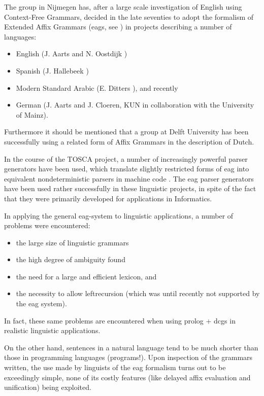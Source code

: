 The group in Nijmegen has, after a large scale investigation of English
using Context-Free Grammars, decided in the late seventies
to adopt the formalism of Extended Affix Grammars
({\sc eag}s, see \cite{l20}) in projects describing a number of languages:
\begin{itemize}
\item English (J. Aarts and N. Oostdijk \cite{l23})
\item Spanish (J. Hallebeek \cite{l26,hallebeek:diss})
\item Modern Standard Arabic (E. Ditters \cite{l25}), and recently
\item German (J. Aarts and J. Cloeren, KUN in collaboration with the
University of Mainz).
\end{itemize}
Furthermore it should be mentioned that a group at Delft University \cite{l29}
has been successfully using a related form of Affix Grammars in the description of Dutch.

In the course of the TOSCA project, a number
of increasingly powerful parser generators have been used,
which translate slightly restricted forms of {\sc eag} into equivalent
nondeterministic parsers in machine code \cite{l20}. The {\sc eag} parser generators
have been used rather successfully in these linguistic projects, in spite of
the fact that they were primarily developed for applications in Informatics.

In applying the general {\sc eag}-system to linguistic applications, a number
of problems were encountered:
\begin{itemize}
\item the large size of linguistic grammars
\item the high degree of ambiguity found
\item the need for a large and efficient lexicon, and
\item the necessity to allow leftrecursion (which was until recently
not supported by the {\sc eag} system).
\end{itemize}
In fact, these same problems are encountered when using
{\sc prolog} + {\sc dcg}s in realistic linguistic applications.

On the other hand, sentences in a natural language tend to be much
shorter than those in programming languages (programs!).
Upon inspection of the grammars written, the use made
by linguists of the {\sc eag} formalism turns out to be exceedingly
simple, none of its costly features (like delayed
affix evaluation and unification) being exploited.

